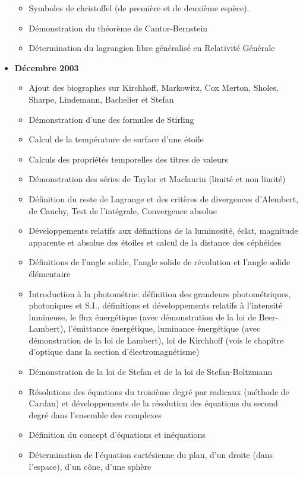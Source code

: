 \begin{itemize}
\begin{itemize}[noitemsep]
				\item Symboles de christoffel (de première et de deuxième espèce).
				\item Démonstration du théorème de Cantor-Bernstein
				\item Détermination du lagrangien libre généralisé en Relativité Générale
			\end{itemize}
		\item \textbf{Décembre 2003}
			\begin{itemize}[noitemsep]
				\item Ajout des biographes sur Kirchhoff, Markowitz, Cox Merton, Sholes, Sharpe, Lindemann, Bachelier et Stefan 
				\item Démonstration d'une des formules de Stirling
				\item Calcul de la température de surface d'une étoile
				\item Calculs des propriétés temporelles des titres de valeurs
				\item Démonstration des séries de Taylor et Maclaurin (limité et non limité)
				\item Définition du reste de Lagrange et des critères de divergences d'Alembert, de Cauchy, Test de l'intégrale, Convergence absolue
				\item Développements relatifs aux définitions de la luminosité, éclat, magnitude apparente et absolue des étoiles et calcul de la distance des céphéides
				\item Définitions de l'angle solide, l'angle solide de révolution et l'angle solide élémentaire
				\item Introduction à la photométrie: définition des grandeurs photométriques, photoniques et S.I., définitions et développements relatifs à l'intensité lumineuse, le flux énergétique (avec démonstration de la loi de Beer-Lambert), l'émittance énergétique, luminance énergétique (avec démonstration de la loi de Lambert), loi de Kirchhoff (vois le chapitre d'optique dans la section d'électromagnétisme)
				\item Démonstration de la loi de Stefan et de la loi de Stefan-Boltzmann
				\item Résolutions des équations du troisième degré par radicaux (méthode de Cardan) et développements de la résolution des équations du second degré dans l'ensemble des complexes
				\item Définition du concept d'équations et inéquations
				\item Détermination de l'équation cartésienne du plan, d'un droite (dans l'espace), d'un cône, d'une sphère

\end{itemize}
\end{itemize}
